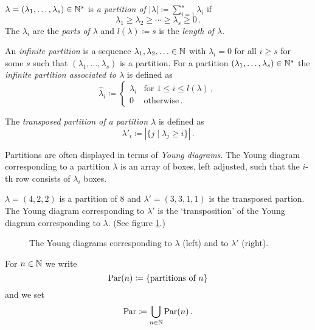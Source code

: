 \begin{definition}
  $\lambda = (\lambda_1, \dotsc, \lambda_s) \in \mathbb{N}^s$ is \emph{a partition of $|\lambda| \coloneqq \sum_{i=1}^s \lambda_i$} if
  \[
          \lambda_1
    \geq  \lambda_2
    \geq  \dotsb
    \geq  \lambda_s
    \geq  0 \,.
  \]
  The $\lambda_i$ are the \emph{parts of $\lambda$} and $l(\lambda) \coloneqq s$ is the \emph{length of $\lambda$}.
  
  An \emph{infinite partition} is a sequence $\lambda_1, \lambda_2, \dotsc \in \mathbb{N}$ with $\lambda_i = 0$ for all $i \geq s$ for some $s$ such that $(\lambda_1, \dotsc, \lambda_s)$ is a partition.
  For a partition $(\lambda_1, \dotsc, \lambda_s) \in \mathbb{N}^s$ the \emph{infinite partition associated to $\lambda$} is defined as
  \[
              \hat{\lambda}_i
    \coloneqq \begin{cases}
                \lambda_i & \text{for } 1 \leq i \leq l(\lambda) \,,  \\
                        0 & \text{otherwise} \,.
              \end{cases}
  \]
  
  The \emph{transposed partition of a partition $\lambda$} is defined as
  \[
              \lambda'_i
    \coloneqq |\{j \mid \lambda_j \geq i\}| \,.
  \]
\end{definition}


Partitions are often displayed in terms of \emph{Young diagrams}.
The Young diagram corresponding to a partition $\lambda$ is an array of boxes, left adjusted, such that the $i$-th row consists of $\lambda_i$ boxes.


\begin{example}
  $\lambda = (4,2,2)$ is a partition of $8$ and $\lambda' = (3,3,1,1)$ is the transposed partion.
  The Young diagram corresponding to $\lambda'$ is the `transposition' of the Young diagram corresponding to $\lambda$.
  (See figure \ref{figure: Young diagram example}.)
  \begin{figure}
    \centering
    \qquad
    \caption{The Young diagrams corresponding to $\lambda$ (left) and to $\lambda'$ (right).}
    \label{figure: Young diagram example}
  \end{figure}
\end{example}


\begin{definition}
  For $n \in \mathbb{N}$ we write
  \[
              \operatorname{Par}(n)
    \coloneqq \{\text{partitions of $n$}\}
  \]
  and we set
  \[
              \operatorname{Par}
    \coloneqq \bigcup_{n \in \mathbb{N}} \operatorname{Par}(n) \,.
  \]
\end{definition}
  

